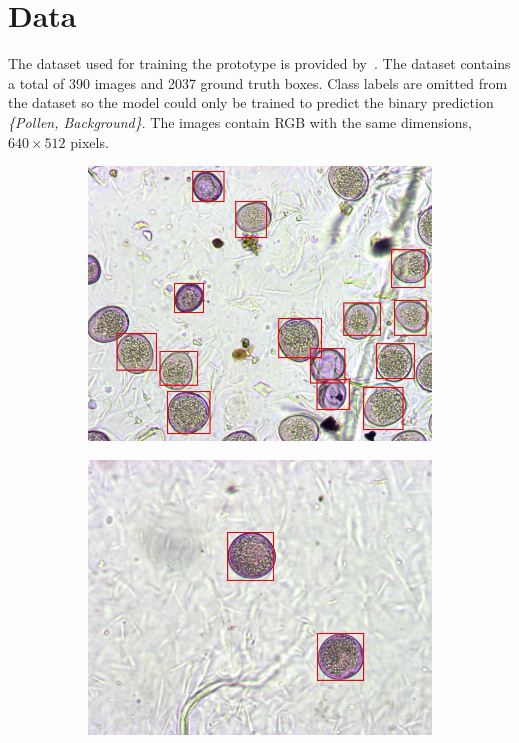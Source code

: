 \section*{Data}
The dataset used for training the prototype is provided by~\cite{gallardo_caballero_precise_2019}.
The dataset contains a total of 390 images and 2037 ground truth boxes.
Class labels are omitted from the dataset so the model could only be trained to predict the binary prediction \textit{\{Pollen, Background\}}.
The images contain RGB with the same dimensions, \( 640\times 512 \) pixels.

\begin{figure}[htbp]
  \centering
  \begin{subfigure}[b]{0.4\textwidth}
    \centering
    \includegraphics[width=\textwidth]{figs/ex_04}
    \vspace*{0.02\textwidth}
  \end{subfigure}%
  \hspace*{0.04\textwidth}
  \begin{subfigure}[b]{0.4\textwidth}
    \centering
    \includegraphics[width=\textwidth]{figs/ex_03}
    \vspace*{0.02\textwidth}
  \end{subfigure}


\end{figure}

